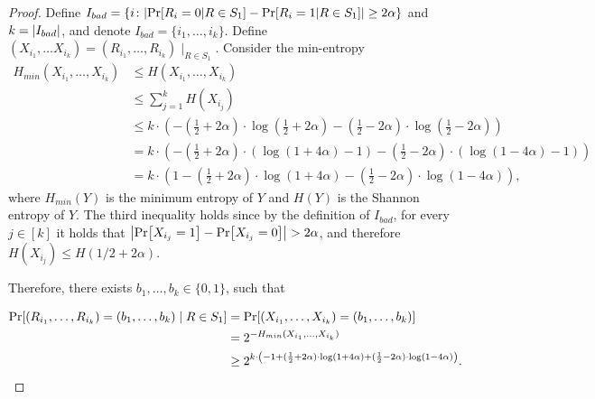{\begin{proof}
    Define $I_{bad}=\{i \colon \size{\Pr[R_i=0|R\in S_1]-\Pr[R_i=1|R\in S_1]} \geq 2\alpha\}$ and $k=\size{I_{bad}}$, and denote $I_{bad}=\{i_1,\dots,i_k\}$. Define $(X_{i_1}, \ldots X_{i_k}) = (R_{i_1},\dots,R_{i_k})\mid_{R \in S_1}$. 
    Consider the min-entropy
	$$
	\begin{array}{rl}
		H_{min}(X_{i_1},\dots,X_{i_k})&\leq H(X_{i_1},\dots,X_{i_k})\\
		&\leq \sum_{j=1}^k H(X_{i_j})\\
		&\leq k\cdot \left(-(\frac{1}{2}+2\alpha)\cdot\log(\frac{1}{2}+2\alpha)-(\frac{1}{2}-2\alpha)\cdot\log(\frac{1}{2}-2\alpha)\right)\\
            &=k\cdot \left(-(\frac{1}{2}+2\alpha)\cdot(\log(1+4\alpha)-1)-(\frac{1}{2}-2\alpha)\cdot(\log(1-4\alpha)-1)\right)\\
            &=k\cdot \left(1-(\frac{1}{2}+2\alpha)\cdot\log(1+4\alpha)-(\frac{1}{2}-2\alpha)\cdot\log(1-4\alpha)\right),
		
	\end{array}
	$$
	where $H_{min}(Y)$ is the minimum entropy of $Y$ and $H(Y)$ is the Shannon entropy of $Y$.
        The third inequality holds since by the definition of $I_{bad}$, for every $j \in [k]$ it holds that $\size{\pr{X_{i_j} = 1}-\pr{X_{i_j} = 0}} > 2\alpha$, and therefore $H(X_{i_j}) \leq H(1/2 + 2\alpha)$.
	
	Therefore, there exists $b_1,\dots,b_k\in\{0,1\}$, such that 
	
	\begin{align}\label{eq:min-entropy-result}
		\Pr\left[(R_{i_1},\ldots,R_{i_k}) = (b_1,\ldots,b_k) \mid R\in S_1\right]
		&= \pr{(X_{i_1},\ldots,X_{i_k}) = (b_1,\ldots,b_k)}\\
		&= 2^{-H_{min}(X_{i_1},\dots,X_{i_k})}\nonumber\\
		&\geq 2^{k\cdot \left(-1+(\frac{1}{2}+2\alpha)\cdot\log(1+4\alpha)+(\frac{1}{2}-2\alpha)\cdot\log(1-4\alpha)\right)}.\nonumber
	\end{align}
	

\end{proof}}
